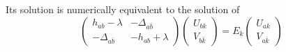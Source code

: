 \documentclass[10pt,a4paper]{article}
\begin{document}
Its solution is numerically equivalent to the solution of
\begin{equation}
\begin{pmatrix} h_{ab}-\lambda & -\Delta_{a\bar{b}} \\
-\Delta_{a\bar{b}} & -h_{ab}+\lambda \end{pmatrix}
\begin{pmatrix} U_{bk} \\ V_{b\bar{k}} \end{pmatrix} =
E_k \begin{pmatrix} U_{ak} \\ V_{a\bar{k}} \end{pmatrix}
\end{equation}
\end{document}
